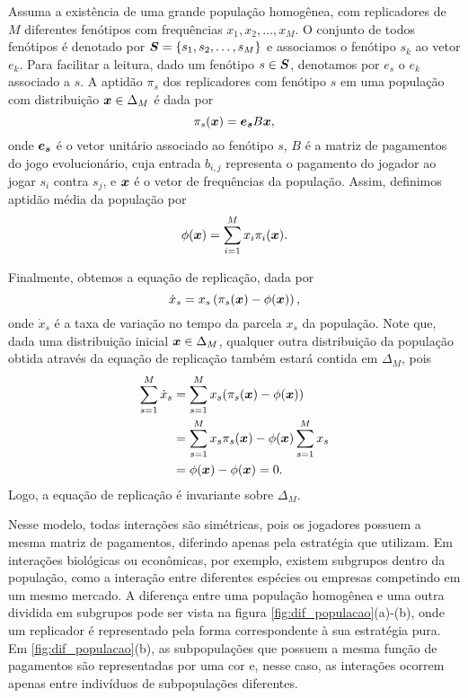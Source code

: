 Assuma a existência de uma grande população homogênea, com replicadores de $M$ diferentes fenótipos com frequências $x_1,x_2,\dots,x_M$. O conjunto de todos fenótipos é denotado por $\boldsymbol{S}=\{s_1,s_2,\dots,s_M\}$ e associamos o fenótipo $s_k$ ao vetor $e_k$. Para facilitar a leitura, dado um fenótipo $s\in\boldsymbol{S}$, denotamos por $e_s$ o $e_k$ associado a $s$. A aptidão $\pi_s$ dos replicadores com fenótipo $s$ em uma população com distribuição $\boldsymbol{x}\in\Delta_M$ é dada por
\begin{equation}
    \pi_s(\boldsymbol{x})=\boldsymbol{e_s} B \boldsymbol{x},
\end{equation}
onde $\boldsymbol{e_s}$ é o vetor unitário associado ao fenótipo $s$, $B$ é a matriz de pagamentos do jogo evolucionário, cuja entrada $b_{i,j}$ representa o pagamento do jogador ao jogar $s_i$ contra $s_j$, e $\boldsymbol{x}$ é o vetor de frequências da população. Assim, definimos aptidão média da população por
\begin{equation}
    \phi(\boldsymbol{x})=\sum_{i=1}^M x_i\pi_i(\boldsymbol{x}).
\end{equation}

Finalmente, obtemos a equação de replicação, dada por
\begin{equation}
    \label{eqRep}
    \dot{x}_s=x_s\left(\pi_s(\boldsymbol{x})-\phi(\boldsymbol{x})\right),
\end{equation}
onde $\dot{x}_s$ é a taxa de variação no tempo da parcela $x_s$ da população. Note que, dada uma distribuição inicial $\boldsymbol{x}\in\Delta_M$, qualquer outra distribuição da população obtida através da equação de replicação também estará contida em $\Delta_M$, pois
\begin{equation}
\begin{split}
    \label{invEqRep}
    \sum_{s=1}^M\dot{x}_s&=\sum_{s=1}^M x_s(\pi_s(\boldsymbol{x})-\phi(\boldsymbol{x})) \\
    &= \sum_{s=1}^M x_s\pi_s(\boldsymbol{x})-\phi(\boldsymbol{x})\sum_{s=1}^M x_s \\
    &= \phi(\boldsymbol{x})-\phi(\boldsymbol{x})=0.
\end{split}
\end{equation}
Logo, a equação de replicação é invariante sobre $\Delta_M$.

Nesse modelo, todas interações são simétricas, pois os jogadores possuem a mesma matriz de pagamentos, diferindo apenas pela estratégia que utilizam. Em interações biológicas ou econômicas, por exemplo, existem subgrupos dentro da população, como a interação entre diferentes espécies ou empresas competindo em um mesmo mercado. A diferença entre uma população homogênea e uma outra dividida em subgrupos pode ser vista na figura \ref{fig:dif_populacao}(a)-(b), onde um replicador é representado pela forma correspondente à sua estratégia pura. Em \ref{fig:dif_populacao}(b), as subpopulações que possuem a mesma função de pagamentos são representadas por uma cor e, nesse caso, as interações ocorrem apenas entre indivíduos de subpopulações diferentes.

